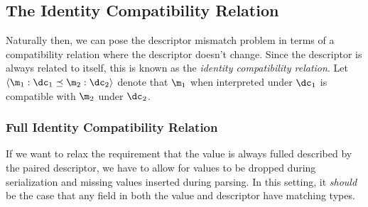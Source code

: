 \subsection{The Identity Compatibility Relation}\label{sec:id-compat}
Naturally then, we can pose the descriptor mismatch problem in terms of a
compatibility relation where the descriptor doesn't change. Since the descriptor
is always related to itself, this is known as the \emph{identity compatibility
  relation}. Let $\langle \m_1 : \dc_1 \msgrel \m_2 : \dc_2 \rangle$ denote that $\m_1$
when interpreted under $\dc_1$ is compatible with $\m_2$ under $\dc_2$.


\subsubsection{Full Identity Compatibility Relation}\label{sec:full-id-compat}
If we want to relax the requirement that the value is always fulled described by
the paired descriptor, we have to allow for values to be dropped during
serialization and missing values inserted during parsing. In this setting, it
\emph{should} be the case that any field in both the value and descriptor have
matching types.

